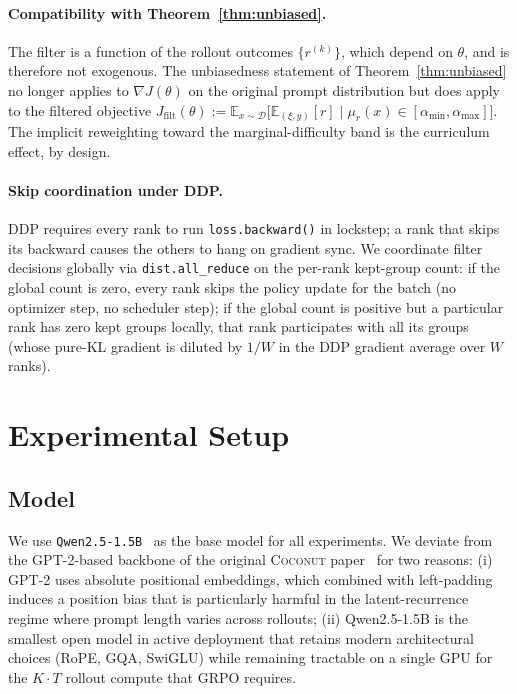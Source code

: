 \documentclass[11pt]{article}
\theoremstyle{definition}
\theoremstyle{remark}
\newcommand{\E}{\mathbb{E}}
\newcommand{\D}{\mathcal{D}}
\begin{document}
\paragraph{Compatibility with Theorem~\ref{thm:unbiased}.}
The filter is a function of the rollout outcomes $\{r^{(k)}\}$, which
depend on $\theta$, and is therefore not exogenous.  The unbiasedness
statement of Theorem~\ref{thm:unbiased} no longer applies to
$\nabla J(\theta)$ on the original prompt distribution but does apply
to the filtered objective
$J_{\mathrm{filt}}(\theta) := \E_{x \sim \D}\big[\E_{(\xi, y)}[r] \mid \mu_r(x) \in [\alpha_{\min}, \alpha_{\max}]\big]$.
The implicit reweighting toward the marginal-difficulty band is the
curriculum effect, by design.

\paragraph{Skip coordination under DDP.}
DDP requires every rank to run \texttt{loss.backward()} in lockstep;
a rank that skips its backward causes the others to hang on gradient
sync.  We coordinate filter decisions globally via
\texttt{dist.all\_reduce} on the per-rank kept-group count: if the
global count is zero, every rank skips the policy update for the
batch (no optimizer step, no scheduler step); if the global count is
positive but a particular rank has zero kept groups locally, that
rank participates with all its groups (whose pure-KL gradient is
diluted by $1 / W$ in the DDP gradient average over $W$ ranks).

\section{Experimental Setup}
\label{sec:setup}

\subsection{Model}
\label{sec:setup-model}

We use \texttt{Qwen2.5-1.5B}~\citep{qwen2024} as the base model for
all experiments.  We deviate from the GPT-2-based backbone of the
original \textsc{Coconut} paper~\citep{hao2024coconut} for two reasons:
(i) GPT-2 uses absolute positional embeddings, which combined with
left-padding induces a position bias that is particularly harmful in
the latent-recurrence regime where prompt length varies across
rollouts; (ii) Qwen2.5-1.5B is the smallest open model in active
deployment that retains modern architectural choices (RoPE, GQA, SwiGLU)
while remaining tractable on a single GPU for the $K \cdot T$ rollout
compute that GRPO requires.
\end{document}
